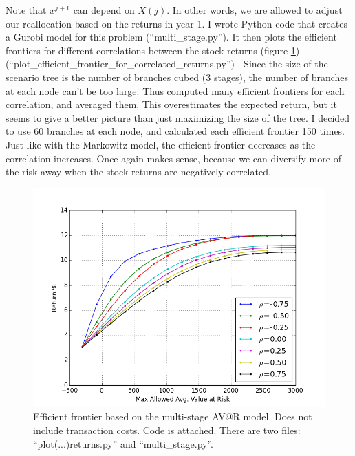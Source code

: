 \documentclass{amsart}
\theoremstyle{definition}
\theoremstyle{remark}
\begin{document}
Note that $x^{j+1}$ can depend on $X(j)$. In other words, we are allowed to adjust our reallocation based on the returns in year 1. I wrote Python code that creates a Gurobi model for this problem (``multi\_stage.py''). It then plots the efficient frontiers for different correlations between the stock returns (figure \ref{fig:multi_stage_no_transaction_costs}) (``plot\_efficient\_frontier\_for\_correlated\_returns.py'') . Since the size of the scenario tree is the number of branches cubed (3 stages), the number of branches at each node can't be too large. Thus computed many efficient frontiers for each correlation, and averaged them. This overestimates the expected return, but it seems to give a better picture than just maximizing the size of the tree. I decided to use 60 branches at each node, and calculated each efficient frontier 150 times.
Just like with the Markowitz model, the efficient frontier decreases as the correlation increases. Once again makes sense, because we can diversify more of the risk away when the stock returns are negatively correlated.
\begin{figure}
\centering
\includegraphics[scale=0.5]{multi_stage_no_transaction_costs.png}
\caption{Efficient frontier based on the multi-stage AV@R model. Does not include transaction costs.  Code is attached. There are two files: ``plot(...)returns.py'' and ``multi\_stage.py''.}
\label{fig:multi_stage_no_transaction_costs}
\end{figure}
\end{document}
